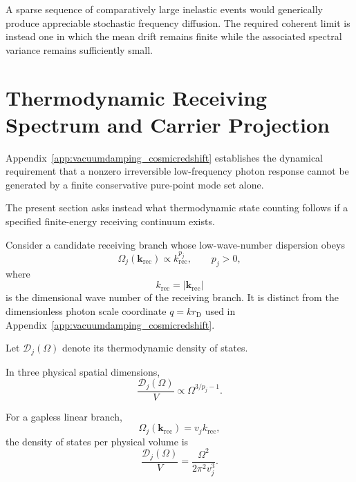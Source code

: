 A sparse sequence of comparatively large inelastic events would generically
produce appreciable stochastic frequency diffusion. The required coherent
limit is instead one in which the mean drift remains finite while the
associated spectral variance remains sufficiently small.


\section{Thermodynamic Receiving Spectrum and Carrier Projection}

Appendix~\ref{app:vacuumdamping_cosmicredshift}
establishes the dynamical requirement that a nonzero irreversible
low-frequency photon response cannot be generated by a finite conservative
pure-point mode set alone.

The present section asks instead what thermodynamic state counting follows if
a specified finite-energy receiving continuum exists.

Consider a candidate receiving branch whose low-wave-number dispersion obeys
\begin{equation}
    \Omega_j(\mathbf k_{\mathrm{rec}})
    \propto
    k_{\mathrm{rec}}^{p_j},
    \qquad
    p_j>0,
    \label{eq:AT_general_dispersion}
\end{equation}
where
\begin{equation}
    k_{\mathrm{rec}}
    =
    \left|
        \mathbf k_{\mathrm{rec}}
    \right|
\end{equation}
is the dimensional wave number of the receiving branch. It is distinct from
the dimensionless photon scale coordinate
\(q=kr_{\mathrm D}\)
used in Appendix~\ref{app:vacuumdamping_cosmicredshift}.

Let
\(\mathcal D_j(\Omega)\)
denote its thermodynamic density of states.

In three physical spatial dimensions,
\begin{equation}
    \frac{\mathcal D_j(\Omega)}{V}
    \propto
    \Omega^{3/p_j-1}.
    \label{eq:AT_general_DOS}
\end{equation}

For a gapless linear branch,
\begin{equation}
    \Omega_j(\mathbf k_{\mathrm{rec}})
    =
    v_jk_{\mathrm{rec}},
    \label{eq:AT_linear_dispersion}
\end{equation}
the density of states per physical volume is
\begin{equation}
    \frac{\mathcal D_j(\Omega)}{V}
    =
    \frac{\Omega^2}{2\pi^2v_j^3}.
    \label{eq:AT_linear_DOS}
\end{equation}

